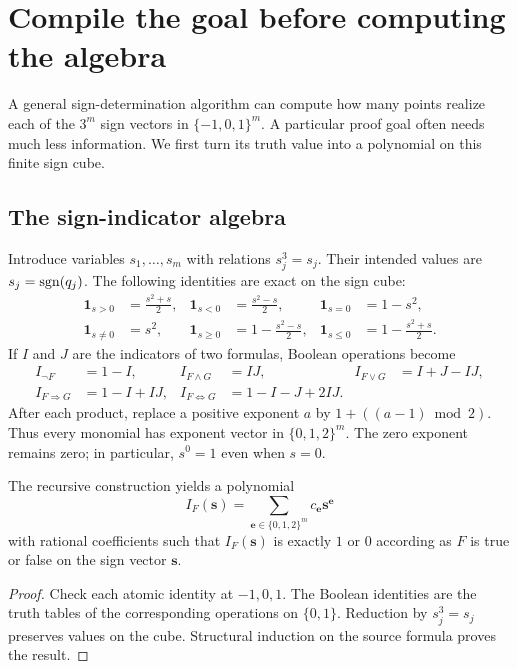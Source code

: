 \section{Compile the goal before computing the algebra}\label{sec:indicator}

A general sign-determination algorithm can compute how many points realize each of the $3^m$ sign vectors in $\{-1,0,1\}^m$. A particular proof goal often needs much less information. We first turn its truth value into a polynomial on this finite sign cube.

\subsection{The sign-indicator algebra}

Introduce variables $s_1,\ldots,s_m$ with relations $s_j^3=s_j$. Their intended values are $s_j=\operatorname{sgn}(q_j)$. The following identities are exact on the sign cube:
\begin{align*}
\mathbf1_{s>0}&=\frac{s^2+s}{2},&
\mathbf1_{s<0}&=\frac{s^2-s}{2},&
\mathbf1_{s=0}&=1-s^2,\\
\mathbf1_{s\ne0}&=s^2,&
\mathbf1_{s\ge0}&=1-\frac{s^2-s}{2},&
\mathbf1_{s\le0}&=1-\frac{s^2+s}{2}.
\end{align*}
If $I$ and $J$ are the indicators of two formulas, Boolean operations become
\begin{align*}
I_{\neg F}&=1-I,&I_{F\wedge G}&=IJ,&I_{F\vee G}&=I+J-IJ,\\
I_{F\Rightarrow G}&=1-I+IJ,&
I_{F\Leftrightarrow G}&=1-I-J+2IJ.
\end{align*}
After each product, replace a positive exponent $a$ by $1+((a-1)\bmod2)$. Thus every monomial has exponent vector in $\{0,1,2\}^m$. The zero exponent remains zero; in particular, $s^0=1$ even when $s=0$.

\begin{proposition}\label{prop:indicator}
The recursive construction yields a polynomial
\[
I_F(\bm s)=\sum_{\bm e\in\{0,1,2\}^m}c_{\bm e}\bm s^{\bm e}
\]
with rational coefficients such that $I_F(\bm s)$ is exactly $1$ or $0$ according as $F$ is true or false on the sign vector $\bm s$.
\end{proposition}
\begin{proof}
Check each atomic identity at $-1,0,1$. The Boolean identities are the truth tables of the corresponding operations on $\{0,1\}$. Reduction by $s_j^3=s_j$ preserves values on the cube. Structural induction on the source formula proves the result.
\end{proof}

